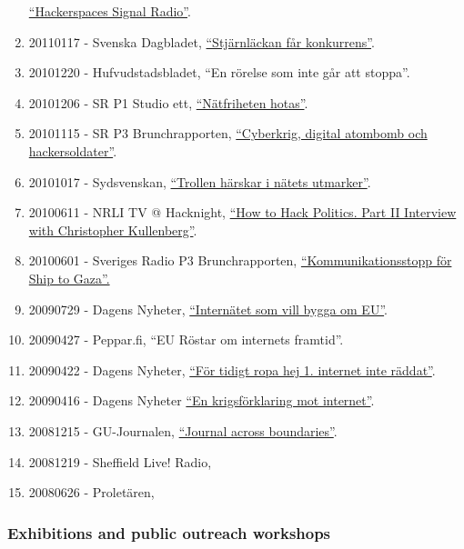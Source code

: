 \documentclass[
]{article}
\begin{document}
\begin{enumerate}
  \href{http://signal.hackerspaces.org/archive/2011-01-13-2200-hacktivism-hour.mp3}{``Hackerspaces
  Signal Radio''}.
\item
  20110117 - Svenska Dagbladet,
  \href{http://www.svd.se/stjarnlackan-far-konkurrens}{``Stjärnläckan
  får konkurrens''}.
\item
  20101220 - Hufvudstadsbladet, ``En rörelse som inte går att stoppa''.
\item
  20101206 - SR P1 Studio ett,
  \href{http://t.sr.se/1CQkYCj}{``Nätfriheten hotas''}.
\item
  20101115 - SR P3 Brunchrapporten,
  \href{http://t.sr.se/RI5PTm}{``Cyberkrig, digital atombomb och
  hackersoldater''}.
\item
  20101017 - Sydsvenskan,
  \href{http://www.sydsvenskan.se/2010-10-17/trollen-harskar-i-natets-utmarker}{``Trollen
  härskar i nätets utmarker''}.
\item
  20100611 - NRLI TV @ Hacknight,
  \href{http://www.youtube.com/watch?v=VhmH6cJZS4k\&feature=related}{``How
  to Hack Politics. Part II Interview with Christopher Kullenberg''}.
\item
  20100601 - Sveriges Radio P3 Brunchrapporten,
  \href{http://t.sr.se/1cnEijY}{``Kommunikationsstopp för Ship to
  Gaza''.}
\item
  20090729 - Dagens Nyheter,
  \href{http://www.dn.se/kultur-noje/nyheter/internatet-som-vill-bygga-om-eu/}{``Internätet
  som vill bygga om EU''}.
\item
  20090427 - Peppar.fi, ``EU Röstar om internets framtid''.
\item
  20090422 - Dagens Nyheter,
  \href{http://www.dn.se/kultur-noje/musik/for-tidigt-ropa-hej-internet-inte-raddat/}{``För
  tidigt ropa hej 1. internet inte räddat''}.
\item
  20090416 - Dagens Nyheter
  \href{http://www.dn.se/kultur-noje/en-krigsforklaring-mot-internet/}{``En
  krigsförklaring mot internet''}.
\item
  20081215 - GU-Journalen,
  \href{http://www.gu-journalen.gu.se/english/News/News_detail/?contentId=855527}{``Journal
  across boundaries''}.
\item
  20081219 - Sheffield Live! Radio, \href{http://www.dcs.shef.ac.uk/}{}
\item
  20080626 - Proletären, \href{http://www.proletaren.se/inrikes/}{}
\end{enumerate}

\hypertarget{exhibitions-and-public-outreach-workshops}{%
\subsubsection{Exhibitions and public outreach
workshops}\label{exhibitions-and-public-outreach-workshops}}
\end{document}
